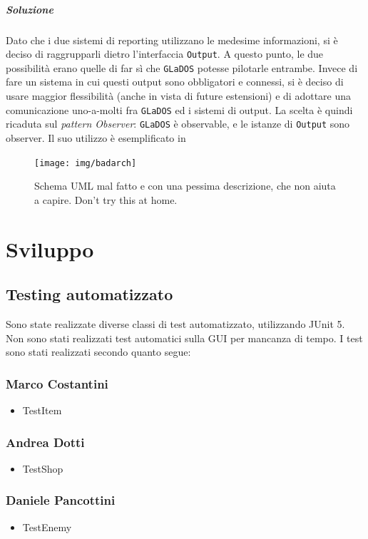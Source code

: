 \documentclass[a4paper,12pt]{report}
\begin{document}
\paragraph{Soluzione} Dato che i due sistemi di reporting utilizzano le medesime informazioni, si è deciso di raggrupparli dietro l'interfaccia \texttt{Output}.
A questo punto, le due possibilità erano quelle di far sì che \texttt{GLaDOS} potesse pilotarle entrambe.
Invece di fare un sistema in cui questi output sono obbligatori e connessi, si è deciso di usare maggior flessibilità (anche in vista di future estensioni)
e di adottare una comunicazione uno-a-molti fra \texttt{GLaDOS} ed i sistemi di output.
La scelta è quindi ricaduta sul \textit{pattern Observer}: \texttt{GLaDOS} è observable, e le istanze di \texttt{Output} sono observer.
%
Il suo utilizzo è esemplificato in 




\begin{figure}[h]
    \centering{}
    \texttt{[image: img/badarch]}
    \caption{Schema UML mal fatto e con una pessima descrizione, che non aiuta a capire. Don't try this at home.}
    \label{img:badarch}
\end{figure}


\chapter{Sviluppo}
\section{Testing automatizzato}
Sono state realizzate diverse classi di test automatizzato, utilizzando JUnit 5.
Non sono stati realizzati test automatici sulla GUI per mancanza di tempo.
I test sono stati realizzati secondo quanto segue:
\subsection*{Marco Costantini}
\begin{itemize}
    \item TestItem
\end{itemize}
\subsection*{Andrea Dotti}
\begin{itemize}
    \item TestShop
\end{itemize}
\subsection*{Daniele Pancottini}
\begin{itemize}
    \item TestEnemy
\end{itemize}
\end{document}
